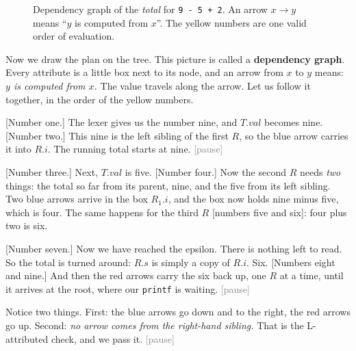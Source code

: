 \documentclass[11pt,a4paper]{article}
\newcommand{\pause}{\textcolor{gray}{\textsf{[pause]}}}
\begin{document}
\begin{onscreen}
\begin{figure}[H]
{}
\caption{Dependency graph of the \emph{total} for \texttt{9 - 5 + 2}. An arrow $x\to y$ means ``$y$ is computed from $x$''. The yellow numbers are one valid order of evaluation.}
\label{fig:v-dep}
\end{figure}
\end{onscreen}

\begin{narration}
Now we draw the plan on the tree. This picture is called a \textbf{dependency graph}. Every attribute is a little box next to its node, and an arrow from $x$ to $y$ means: \emph{$y$ is computed from $x$.} The value travels along the arrow. Let us follow it together, in the order of the yellow numbers.

[Number one.] The lexer gives us the number nine, and $T.val$ becomes nine. [Number two.] This nine is the left sibling of the first $R$, so the blue arrow carries it into $R.i$. The running total starts at nine. \pause

[Number three.] Next, $T.val$ is five. [Number four.] Now the second $R$ needs \emph{two} things: the total so far from its parent, nine, and the five from its left sibling. Two blue arrows arrive in the box $R_1.i$, and the box now holds nine minus five, which is four. The same happens for the third $R$ [numbers five and six]: four plus two is six.

[Number seven.] Now we have reached the epsilon. There is nothing left to read. So the total is turned around: $R.s$ is simply a copy of $R.i$. Six. [Numbers eight and nine.] And then the red arrows carry the six back up, one $R$ at a time, until it arrives at the root, where our \texttt{printf} is waiting. \pause

Notice two things. First: the blue arrows go down and to the right, the red arrows go up. Second: \emph{no arrow comes from the right-hand sibling.} That is the L-attributed check, and we pass it. \pause
\end{narration}
\end{document}
